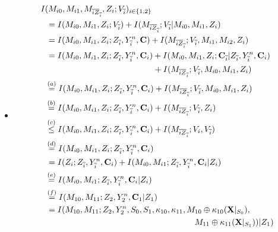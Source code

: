 \documentclass[runningheads]{llncs}
\begin{document}
\begin{itemize}
    \item \begin{align}\label{eq: dep2}
        I &(M_{i0},M_{i1},M_{\overline{i}\overline{Z}_{\overline{i}}}, Z_i; V_{\overline{i}})_{i\in\{1,2\}}\notag\\
        &\,= I (M_{i0},M_{i1}, Z_i; V_{\overline{i}}) + I (M_{\overline{i}\overline{Z}_{\overline{i}}};V_{\overline{i}}|M_{i0},M_{i1}, Z_i)\notag\\
        &\,= I (M_{i0},M_{i1}, Z_i; Z_{\overline{i}},Y^n_{\overline{i}},\mathbf{C}) + I (M_{\overline{i}\overline{Z}_{\overline{i}}};V_{\overline{i}},M_{i1},M_{i2}, Z_i)\notag\\
        &\,= I (M_{i0},M_{i1}, Z_i; Z_{\overline{i}},Y^n_{\overline{i}},\mathbf{C}_i) + I (M_{i0},M_{i1}, Z_i;\mathbf{C}_{\overline{i}}| Z_{\overline{i}},Y^n_{\overline{i}},\mathbf{C}_i)\notag\\
        & \qquad\qquad\qquad\qquad\qquad\qquad\quad+ I (M_{\overline{i}\overline{Z}_{\overline{i}}};V_{\overline{i}},M_{i0},M_{i1}, Z_i )\notag\\
        &\overset{(a)}{=} I (M_{i0},M_{i1}, Z_i; Z_{\overline{i}},Y^n_{\overline{i}},\mathbf{C}_i) + I (M_{\overline{i}\overline{Z}_{\overline{i}}};V_{\overline{i}},M_{i0},M_{i1}, Z_i )\notag\\
        &\overset{(b)}{=} I (M_{i0},M_{i1}, Z_i; Z_{\overline{i}},Y^n_{\overline{i}},\mathbf{C}_i) + I (M_{\overline{i}\overline{Z}_{\overline{i}}};V_{\overline{i}}, Z_i)\notag\\
        &\overset{(c)}{\leq} I (M_{i0},M_{i1}, Z_i; Z_{\overline{i}},Y^n_{\overline{i}},\mathbf{C}_i) + I (M_{\overline{i}\overline{Z}_{\overline{i}}};V_i,V_{\overline{i}})\notag\\
        & \overset{(d)}{=} I (M_{i0},M_{i1}, Z_i; Z_{\overline{i}},Y^n_{\overline{i}},\mathbf{C}_i)\notag\\
        &\, = I(Z_i;Z_{\overline{i}}, Y_{\overline{i}}^n,\mathbf{C}_i) + I (M_{i0},M_{i1}; Z_{\overline{i}},Y^n_{\overline{i}},\mathbf{C}_i|Z_i)\notag\\
        & \overset{(e)}{=} I  (M_{i0},M_{i1}; Z_{\overline{i}},Y^n_{\overline{i}},\mathbf{C}_i|Z_i)\notag\\
        &\overset{(f)}{=} I  (M_{10},M_{11}; Z_{2},Y^n_{2},\mathbf{C}_1|Z_1)\notag\\
        & \,=  I  (M_{10},M_{11}; Z_{2},Y^n_{2},S_0,S_1, \kappa_{10}, \kappa_{11}, M_{10}\oplus\kappa_{10} (\mathbf{X}|_{S_0}),\notag\\
        & \qquad\qquad\qquad\qquad\qquad\qquad\qquad\qquad\qquad M_{11}\oplus\kappa_{11}(\mathbf{X}|_{S_1}))|Z_1)\notag\\

\end{align}
\end{itemize}
\end{document}
